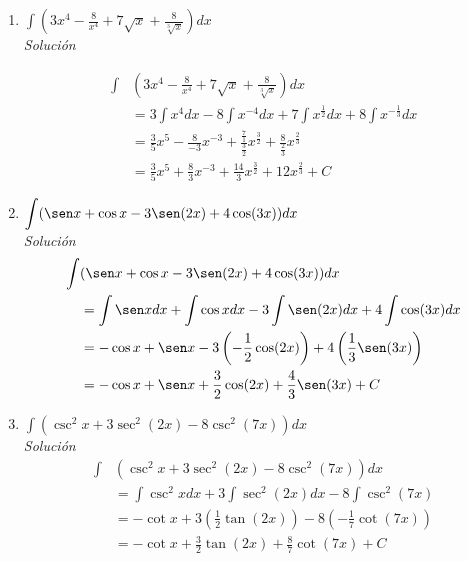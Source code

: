 \begin{enumerate}[leftmargin=1.2em,   itemindent=0pt,       labelwidth=\labelwidth,labelsep=0.5em,]
	
\item $\displaystyle\int \left(3x^{4}-\frac{8}{x^{4}}+7\sqrt{x}+\frac{8}{\sqrt[3]{x}}\right)dx$ \\%

\textit{Solución}

{\small
\begin{align*}
\int &\left(3x^{4}-\frac{8}{x^{4}}+7\sqrt{x}+\frac{8}{\sqrt[3]{x}}\right)dx \\
&
=3\int x^{4}dx-8\int x^{-4}dx+7\int x^{\frac{1}{2}}dx+8\int x^{-\frac{1}{3}}dx \\
&=\frac{3}{5}x^{5}-\frac{8}{-3}x^{-3}+\frac{\frac{7}{1}}{\frac{3}{2}}x^{\frac{
3}{2}}+\frac{8}{\frac{2}{3}}x^{\frac{2}{3}} \\
&
=\frac{3}{5}x^{5}+\frac{8}{3}x^{-3}+\frac{14}{3}x^{\frac{3}{2}}+12x^{\frac{2}{3}}+C
\end{align*}
}

\item $\displaystyle \int (\sen x+\cos x-3\sen (2x)+4\cos (3x))dx$ \\%

\textit{Solución}
{\small
\begin{align*}
\int &(\sen x+\cos x-3\sen (2x)+4\cos (3x))dx\\
&
=\int \sen xdx+\int \cos xdx-3\int \sen (2x)dx+4\int \cos (3x)dx\\
&
=-\cos x+\sen x-3\left(-\frac{1}{2}\cos (2x)\right)+4\left(\frac{1}{3}\sen (3x)\right)\\
&
=-\cos x+\sen x+\frac{3}{2}\cos (2x)+\frac{4}{3}\sen (3x)+C
\end{align*}
}

\item $\displaystyle \int (\csc ^{2}x+3\sec ^{2}(2x)-8\csc ^{2}(7x))dx$ \\%

\textit{Solución}
{\small
\begin{align*}
\int &(\csc ^{2}x+3\sec ^{2}(2x)-8\csc ^{2}(7x))dx\\
&
= \int \csc ^{2}xdx+3\int \sec ^{2}(2x)dx-8\int \csc ^{2}(7x)\\
&=-\cot x+3\left(\frac{1}{2}\tan (2x)\right)-8\left(-\frac{1}{7}\cot (7x)\right)\\
&
=-\cot x+\frac{3}{2}\tan (2x)+\frac{8}{7}\cot (7x)+C
\end{align*}
}



\end{enumerate}
